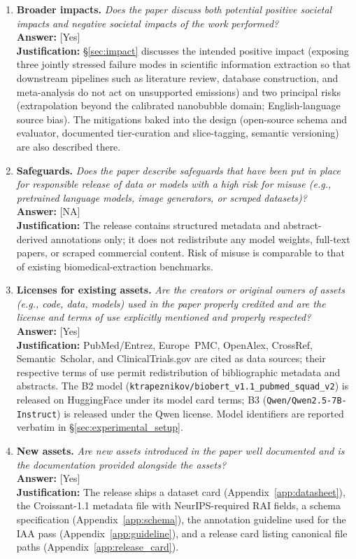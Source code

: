 \begin{enumerate}
\item \textbf{Broader impacts.}
\emph{Does the paper discuss both potential positive societal impacts
and negative societal impacts of the work performed?}\\
\textbf{Answer:} [Yes] \\
\textbf{Justification:} \S\ref{sec:impact} discusses the intended
positive impact (exposing three jointly stressed failure modes in
scientific information extraction so that downstream pipelines such
as literature review, database construction, and meta-analysis do
not act on unsupported emissions) and two principal risks
(extrapolation beyond the calibrated nanobubble domain;
English-language source bias). The mitigations baked into the design
(open-source schema and evaluator, documented tier-curation and
slice-tagging, semantic versioning) are also described there.

\item \textbf{Safeguards.}
\emph{Does the paper describe safeguards that have been put in place
for responsible release of data or models with a high risk for misuse
(e.g., pretrained language models, image generators, or scraped
datasets)?}\\
\textbf{Answer:} [NA] \\
\textbf{Justification:} The release contains structured metadata and
abstract-derived annotations only; it does not redistribute any model
weights, full-text papers, or scraped commercial content. Risk of
misuse is comparable to that of existing biomedical-extraction
benchmarks.

\item \textbf{Licenses for existing assets.}
\emph{Are the creators or original owners of assets (e.g., code,
data, models) used in the paper properly credited and are the license
and terms of use explicitly mentioned and properly respected?}\\
\textbf{Answer:} [Yes] \\
\textbf{Justification:} PubMed/Entrez, Europe~PMC, OpenAlex, CrossRef,
Semantic~Scholar, and ClinicalTrials.gov are cited as data sources;
their respective terms of use permit redistribution of bibliographic
metadata and abstracts. The B2 model
(\texttt{ktrapeznikov/biobert\_v1.1\_pubmed\_squad\_v2}) is released
on HuggingFace under its model card terms; B3
(\texttt{Qwen/Qwen2.5-7B-Instruct}) is released under the Qwen
license. Model identifiers are reported verbatim in
\S\ref{sec:experimental_setup}.

\item \textbf{New assets.}
\emph{Are new assets introduced in the paper well documented and is
the documentation provided alongside the assets?}\\
\textbf{Answer:} [Yes] \\
\textbf{Justification:} The release ships a dataset card
(Appendix~\ref{app:datasheet}), the Croissant-1.1 metadata file with
NeurIPS-required RAI fields, a schema specification
(Appendix~\ref{app:schema}), the annotation guideline used for the
IAA pass (Appendix~\ref{app:guideline}), and a release card listing
canonical file paths (Appendix~\ref{app:release_card}).


\end{enumerate}
